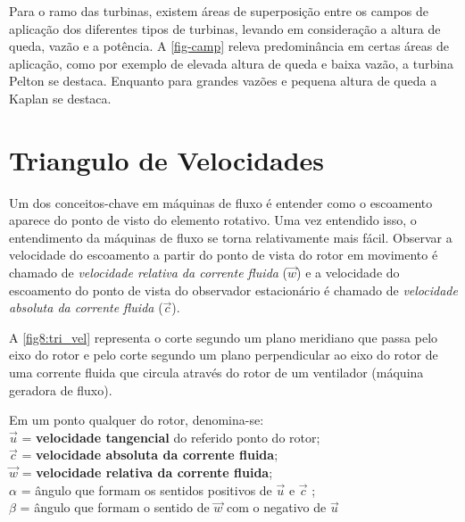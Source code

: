     Para o ramo das turbinas, existem áreas de superposição entre os campos de aplicação dos diferentes tipos de turbinas, levando em consideração a altura de queda, vazão e a potência. A \autoref{fig-camp} releva predominância em certas áreas de aplicação, como por exemplo de elevada altura de queda e baixa vazão, a turbina Pelton se destaca. Enquanto para grandes vazões e pequena altura de queda a Kaplan se destaca.

\section{Triangulo de Velocidades}

    Um dos conceitos-chave em máquinas de fluxo é entender como o escoamento aparece do ponto de visto do elemento rotativo. Uma vez entendido isso, o entendimento da máquinas de fluxo se torna relativamente mais fácil. Observar a velocidade do escoamento a partir do ponto de vista do rotor em movimento é chamado de \textit{velocidade relativa da corrente fluida} ($\vec{w}$) e a velocidade do escoamento do ponto de vista do observador estacionário é chamado de \textit{velocidade absoluta da corrente fluida} ($\vec{c}$).


    A \autoref{fig8:tri_vel} representa o corte segundo um plano meridiano que passa pelo eixo do rotor e pelo corte segundo um plano perpendicular ao eixo do rotor de uma corrente fluida que circula através do rotor de um ventilador (máquina geradora de fluxo).

    \noindent
    Em um ponto qualquer do rotor, denomina-se: \\
        $\vec{u}$ = \textbf{velocidade tangencial} do referido ponto do rotor; \\
        $\vec{c}$ = \textbf{velocidade absoluta da corrente fluida}; \\
        $\vec{w}$ = \textbf{velocidade relativa da corrente fluida}; \\
        $\alpha$ = ângulo que formam os sentidos positivos de $\vec{u}$ e $\vec{c}$ ; \\
        $\beta$ = ângulo que formam o sentido de $\vec{w}$ com o negativo de $\vec{u}$

